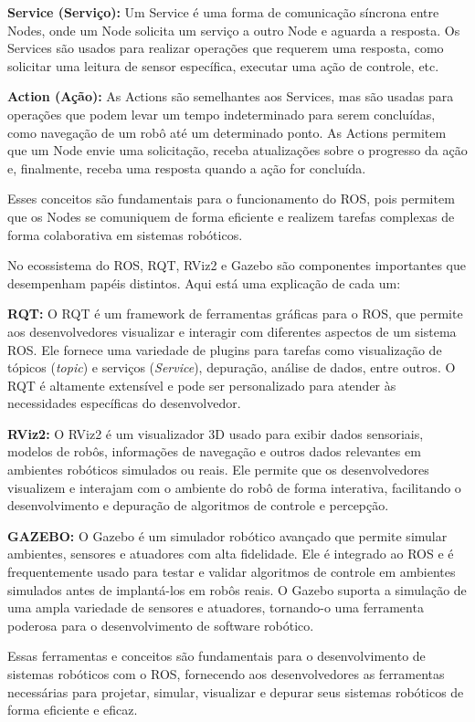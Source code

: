 \textbf{Service (Serviço):} Um Service é uma forma de comunicação síncrona entre Nodes, onde um Node solicita um serviço a outro Node e aguarda a resposta. Os Services são usados para realizar operações que requerem uma resposta, como solicitar uma leitura de sensor específica, executar uma ação de controle, etc.

\textbf{Action (Ação):} As Actions são semelhantes aos Services, mas são usadas para operações que podem levar um tempo indeterminado para serem concluídas, como navegação de um robô até um determinado ponto. As Actions permitem que um Node envie uma solicitação, receba atualizações sobre o progresso da ação e, finalmente, receba uma resposta quando a ação for concluída.

Esses conceitos são fundamentais para o funcionamento do ROS, pois permitem que os Nodes se comuniquem de forma eficiente e realizem tarefas complexas de forma colaborativa em sistemas robóticos.

No ecossistema do ROS, RQT, RViz2 e Gazebo são componentes importantes que desempenham papéis distintos. Aqui está uma explicação de cada um:

\textbf{RQT:} O RQT é um framework de ferramentas gráficas para o ROS, que permite aos desenvolvedores visualizar e interagir com diferentes aspectos de um sistema ROS. Ele fornece uma variedade de plugins para tarefas como visualização de tópicos (\textit{topic}) e serviços (\textit{Service}), depuração, análise de dados, entre outros. O RQT é altamente extensível e pode ser personalizado para atender às necessidades específicas do desenvolvedor.

\textbf{RViz2:} O RViz2 é um visualizador 3D usado para exibir dados sensoriais, modelos de robôs, informações de navegação e outros dados relevantes em ambientes robóticos simulados ou reais. Ele permite que os desenvolvedores visualizem e interajam com o ambiente do robô de forma interativa, facilitando o desenvolvimento e depuração de algoritmos de controle e percepção.

\textbf{GAZEBO: }O Gazebo é um simulador robótico avançado que permite simular ambientes, sensores e atuadores com alta fidelidade. Ele é integrado ao ROS e é frequentemente usado para testar e validar algoritmos de controle em ambientes simulados antes de implantá-los em robôs reais. O Gazebo suporta a simulação de uma ampla variedade de sensores e atuadores, tornando-o uma ferramenta poderosa para o desenvolvimento de software robótico.

Essas ferramentas e conceitos são fundamentais para o desenvolvimento de sistemas robóticos com o ROS, fornecendo aos desenvolvedores as ferramentas necessárias para projetar, simular, visualizar e depurar seus sistemas robóticos de forma eficiente e eficaz.

